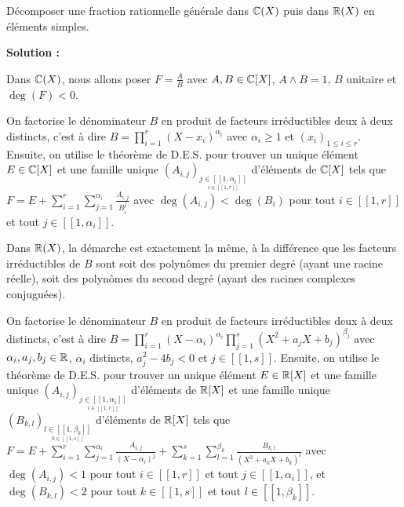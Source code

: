 \documentclass[12pt, a4paper]{report}
\begin{document}
\begin{exercise}
    Décomposer une fraction rationnelle générale dans $\mathbb{C}(X)$ puis dans $\mathbb{R}(X)$ en éléments simples.

    \textbf{Solution :}

    Dans $\mathbb{C}(X)$, nous allons poser $F = \frac AB$ avec $A, B \in \mathbb{C}[X]$, $A \wedge B = 1$, $B$ unitaire et $\deg(F) < 0$.
    \begin{outline}
        \1 On factorise le dénominateur $B$ en produit de facteurs irréductibles deux à deux distincts, c'est à dire $B = \prod_{i=1}^r (X-x_i)^{\alpha_i}$ avec $\alpha_i \ge 1$ et $(x_i)_{1\le i \le r}$.
        \1 Ensuite, on utilise le théorème de D.E.S. pour trouver un unique élément $E \in \mathbb{C}[X]$ et une famille unique $(A_{i,j})_{\underset{i \in [\![1,r]\!]}{j \in [\![1,\alpha_i]\!]}}$ d'éléments de $\mathbb{C}[X]$ tels que $F = E + \sum_{i=1}^r \sum_{j=1}^{\alpha_i} \frac{A_{i,j}}{B_i^j}$ avec $\deg(A_{i,j}) < \deg(B_i)$ pour tout $i \in [\![1,r]\!]$ et tout $j \in [\![1,\alpha_i]\!]$.
    \end{outline}

    Dans $\mathbb{R}(X)$, la démarche est exactement la même, à la différence que les facteurs irréductibles de $B$ sont soit des polynômes du premier degré (ayant une racine réelle), soit des polynômes du second degré (ayant des racines complexes conjuguées).

    \begin{outline}
        \1 On factorise le dénominateur $B$ en produit de facteurs irréductibles deux à deux distincts, c'est à dire $B = \prod_{i=1}^r (X - \alpha_i)^{\alpha_i} \prod_{j=1}^s (X^2 + a_j X + b_j)^{\beta_j}$ avec $\alpha_i, a_j, b_j \in \mathbb{R}$, $\alpha_i$ distincts, $a_j^2 - 4b_j < 0$ et $j \in [\![1,s]\!]$.
        \1 Ensuite, on utilise le théorème de D.E.S. pour trouver un unique élément $E \in \mathbb{R}[X]$ et une famille unique $(A_{i,j})_{\underset{i \in [\![1,r]\!]}{j \in [\![1,\alpha_i]\!]}}$ d'éléments de $\mathbb{R}[X]$ et une famille unique $(B_{k,l})_{\underset{k \in [\![1,s]\!]}{l \in [\![1,\beta_k]\!]}}$ d'éléments de $\mathbb{R}[X]$ tels que $F = E + \sum_{i=1}^r \sum_{j=1}^{\alpha_i} \frac{A_{i,j}}{(X - \alpha_i)^j} + \sum_{k=1}^s \sum_{l=1}^{\beta_k} \frac{B_{k,l}}{(X^2 + a_k X + b_k)^l}$ avec $\deg(A_{i,j}) < 1$ pour tout $i \in [\![1,r]\!]$ et tout $j \in [\![1,\alpha_i]\!]$, et $\deg(B_{k,l}) < 2$ pour tout $k \in [\![1,s]\!]$ et tout $l \in [\![1,\beta_k]\!]$.
    \end{outline}

\end{exercise}
\end{document}
